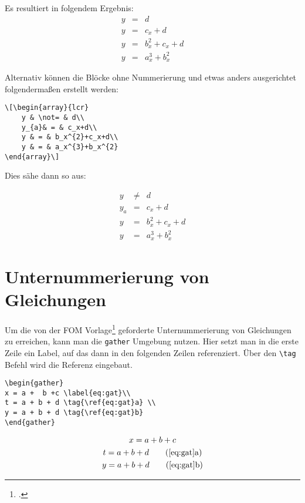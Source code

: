 Es resultiert in folgendem Ergebnis:
\begin{eqnarray}
    y & = & d\\
    y & = & c_x+d\\
    y & = & b_x^{2}+c_x+d\\
    y & = & a_x^{3}+b_x^{2}
\end{eqnarray}

Alternativ können die Blöcke ohne Nummerierung und etwas anders ausgerichtet folgendermaßen erstellt werden:
\begin{lstlisting}
\[\begin{array}{lcr}
    y & \not= & d\\
    y_{a}& = & c_x+d\\
    y & = & b_x^{2}+c_x+d\\
    y & = & a_x^{3}+b_x^{2}
\end{array}\]
\end{lstlisting}

Dies sähe dann so aus:

\[\begin{array}{lcr}
    y & \not= & d\\
    y_{a}& = & c_x+d\\
    y & = & b_x^{2}+c_x+d\\
    y & = & a_x^{3}+b_x^{2}
\end{array}\]

\section{Unternummerierung von Gleichungen}

Um die von der FOM Vorlage\footcite[S. 20]{fomleitfaden} geforderte Unternummerierung von Gleichungen zu erreichen, kann man die \texttt{gather} Umgebung nutzen. Hier setzt man in die erste Zeile ein Label, auf das dann in den folgenden Zeilen referenziert. Über den \texttt{\textbackslash tag} Befehl wird die Referenz eingebaut.


\begin{lstlisting}
\begin{gather}
x = a +  b +c \label{eq:gat}\\
t = a + b + d \tag{\ref{eq:gat}a} \\
y = a + b + d \tag{\ref{eq:gat}b}
\end{gather}
\end{lstlisting}


\begin{gather}
x = a +  b +c \label{eq:gat}\\
t = a + b + d \tag{\ref{eq:gat}a} \\
y = a + b + d \tag{\ref{eq:gat}b}
\end{gather}



